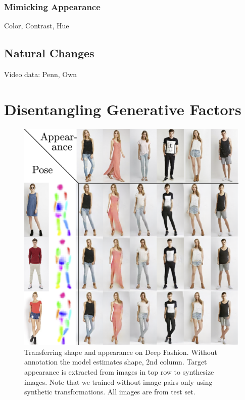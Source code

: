 		\subsubsection{Mimicking Appearance}
		Color, Contrast, Hue
		\subsection{Natural Changes}
		Video data: Penn, Own
\section{Disentangling Generative Factors}

	\begin{figure}[t]
		\centering
		\includegraphics[trim={0cm 0cm 0cm 0cm},clip, width=.7\linewidth]{fig/swappy}
		\caption{Transferring shape and appearance on Deep Fashion. Without annotation the model estimates shape, 2nd column. Target appearance is extracted from images in top row to synthesize images. Note that we trained without image pairs only using synthetic transformations.
		All images are from test set.}
		\label{fig:allswaps}
	\end{figure}

